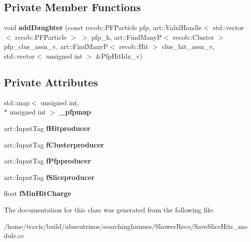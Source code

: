 \subsection*{Private Member Functions}
\begin{DoxyCompactItemize}
\item 
\hypertarget{classSaveSliceHits_a13bfe5d175be84fe7b949a967a5da465}{void {\bfseries add\-Daughter} (const recob\-::\-P\-F\-Particle pfp, art\-::\-Valid\-Handle$<$ std\-::vector$<$ recob\-::\-P\-F\-Particle $>$ $>$ pfp\-\_\-h, art\-::\-Find\-Many\-P$<$ recob\-::\-Cluster $>$ pfp\-\_\-clus\-\_\-assn\-\_\-v, art\-::\-Find\-Many\-P$<$ recob\-::\-Hit $>$ clus\-\_\-hit\-\_\-assn\-\_\-v, std\-::vector$<$ unsigned int $>$ \&Pfp\-Hit\-Idx\-\_\-v)}\label{classSaveSliceHits_a13bfe5d175be84fe7b949a967a5da465}

\end{DoxyCompactItemize}
\subsection*{Private Attributes}
\begin{DoxyCompactItemize}
\item 
\hypertarget{classSaveSliceHits_a4a8537787643bd309b910620bcb2e154}{std\-::map$<$ unsigned int, \\*
unsigned int $>$ {\bfseries \-\_\-pfpmap}}\label{classSaveSliceHits_a4a8537787643bd309b910620bcb2e154}

\item 
\hypertarget{classSaveSliceHits_a6a289d782481d17dc39c931d62d0f31c}{art\-::\-Input\-Tag {\bfseries f\-Hitproducer}}\label{classSaveSliceHits_a6a289d782481d17dc39c931d62d0f31c}

\item 
\hypertarget{classSaveSliceHits_a4e6d5a3f1ab4ddc732f5758a3759effa}{art\-::\-Input\-Tag {\bfseries f\-Clusterproducer}}\label{classSaveSliceHits_a4e6d5a3f1ab4ddc732f5758a3759effa}

\item 
\hypertarget{classSaveSliceHits_ac2f381959f9bc912590888c6a86c8965}{art\-::\-Input\-Tag {\bfseries f\-Pfpproducer}}\label{classSaveSliceHits_ac2f381959f9bc912590888c6a86c8965}

\item 
\hypertarget{classSaveSliceHits_a942b1c4ea132e951aa39637e2f5d3e21}{art\-::\-Input\-Tag {\bfseries f\-Sliceproducer}}\label{classSaveSliceHits_a942b1c4ea132e951aa39637e2f5d3e21}

\item 
\hypertarget{classSaveSliceHits_a68cfd0c337276c49f781fa06495effb1}{float {\bfseries f\-Min\-Hit\-Charge}}\label{classSaveSliceHits_a68cfd0c337276c49f781fa06495effb1}

\end{DoxyCompactItemize}


The documentation for this class was generated from the following file\-:\begin{DoxyCompactItemize}
\item 
/home/travis/build/ubneutrinos/searchingfornues/\-Shower\-Reco/Save\-Slice\-Hits\-\_\-module.\-cc\end{DoxyCompactItemize}
